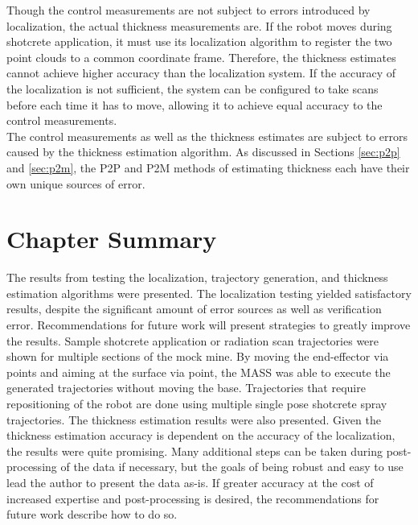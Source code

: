 Though the control measurements are not subject to errors introduced by localization, the actual thickness measurements are. If the robot moves during shotcrete application, it must use its localization algorithm to register the two point clouds to a common coordinate frame. Therefore, the thickness estimates cannot achieve higher accuracy than the localization system. If the accuracy of the localization is not sufficient, the system can be configured to take scans before each time it has to move, allowing it to achieve equal accuracy to the control measurements.\\

The control measurements as well as the thickness estimates are subject to errors caused by the thickness estimation algorithm. As discussed in Sections \ref{sec:p2p} and \ref{sec:p2m}, the P2P and P2M methods of estimating thickness each have their own unique sources of error.\\

\section{Chapter Summary}

The results from testing the localization, trajectory generation, and thickness estimation algorithms were presented. The localization testing yielded satisfactory results, despite the significant amount of error sources as well as verification error. Recommendations for future work will present strategies to greatly improve the results. Sample shotcrete application or radiation scan trajectories were shown for multiple sections of the mock mine. By moving the end-effector via points and aiming at the surface via point, the MASS was able to execute the generated trajectories without moving the base. Trajectories that require repositioning of the robot are done using multiple single pose shotcrete spray trajectories. The thickness estimation results were also presented. Given the thickness estimation accuracy is dependent on the accuracy of the localization, the results were quite promising. Many additional steps can be taken during post-processing of the data if necessary, but the goals of being robust and easy to use lead the author to present the data as-is. If greater accuracy at the cost of increased expertise and post-processing is desired, the recommendations for future work describe how to do so.\\